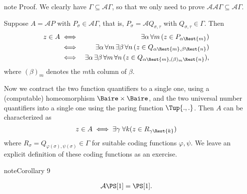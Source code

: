 \documentclass[letterpaper,10pt,english]{jupyterBook}
\begin{document}
\begin{sphinxadmonition}{note}
\sphinxAtStartPar
Proof. We clearly have  \( \Gamma \subseteq  \mathcal{A} \Gamma\), so that we only need to prove \(\mathcal{A} \mathcal{A} \Gamma \subseteq \mathcal{A} \Gamma\).

\sphinxAtStartPar
Suppose \(A = \mathcal{A} P\) with \(P_\sigma \in \mathcal{A} \Gamma\), that is, \(P_\sigma = \mathcal{A} Q_{\sigma,\tau}\) with \(Q_{\sigma,\tau} \in  \Gamma\). Then
\begin{eqnarray*}
z \in A & \iff & \exists \alpha  \, \forall m \, (z \in P_{\alpha\Rest{m}})\\
    & \iff & \exists \alpha \, \forall m \, \exists \beta \, \forall n \, (z \in Q_{\alpha\Rest{m},\beta\Rest{n} })\\
    &\iff & \exists \alpha \,  \exists \beta \, \forall m \, \forall n \, (z \in Q_{\alpha\Rest{m},(\beta)_m\Rest{n}}),
\end{eqnarray*}
\sphinxAtStartPar
where \((\beta)_m\) denotes the \(m\)\sphinxhyphen{}th column of \(\beta\).

\sphinxAtStartPar
Now we contract the two function quantifiers to a single one, using a (computable) homeomorphism \(\Baire \times \Baire\), and the two universal number quantifiers into a single one using the paring function \(\Tup{.,.}\). Then \(A\) can be characterized as
\begin{equation*}
z \in A \iff \exists \gamma  \; \forall k (z \in R_{\gamma\Rest{k}})
\end{equation*}
\sphinxAtStartPar
where \(R_\sigma = Q_{\varphi(\sigma), \psi(\sigma)} \in \Gamma\) for suitable coding functions \(\varphi, \psi\). We leave an explicit definition of these coding functions as an exercise.
\end{sphinxadmonition}
\label{regularityAnalytic:cor-analytic-Souslin-closed}
\begin{sphinxadmonition}{note}{Corollary 9}


\begin{equation*}
\begin{split}
	\mathcal{A}\PS[1] = \PS[1].
\end{split}
\end{equation*}\end{sphinxadmonition}
\end{document}
